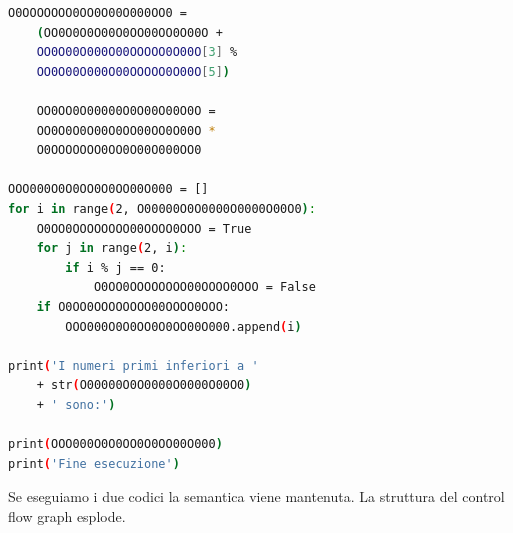 \documentclass[a4paper,oneside,openright,titlepage,10pt,footinclude,headinclude]{scrbook}
\begin{document}
\begin{graybox}
\begin{lstlisting}[language=bash,basicstyle=\fontsize{10}{9}\selectfont,]
    O0OOOOOOO0OO0O00O000OO0 = 
    (OO0O0O0O00O0OO00OO0O00O + 
    OO0O00O000O00OOOOO0O00O[3] % 
    OO0O00O000O00OOOOO0O00O[5])
    
    OO0OO0O00000O0O00O00O0O = 
    OO0O0O0O00O0OO00OO0O00O * 
    O0OOOOOOO0OO0O00O000OO0
    
OOO000O0O0OO0O0OO00O000 = []
for i in range(2, O00000O0O0000O0000O00O0):
    O0OO0OOOOOOOO00OOOO0OOO = True
    for j in range(2, i):
        if i % j == 0:
            O0OO0OOOOOOOO00OOOO0OOO = False
    if O0OO0OOOOOOOO00OOOO0OOO:
        OOO000O0O0OO0O0OO00O000.append(i)
        
print('I numeri primi inferiori a ' 
	+ str(O00000O0O0000O0000O00O0) 
	+ ' sono:')
	
print(OOO000O0O0OO0O0OO00O000)
print('Fine esecuzione')
\end{lstlisting}
\end{graybox}

Se eseguiamo i due codici la semantica viene mantenuta. La struttura del control flow graph esplode.
\end{document}
